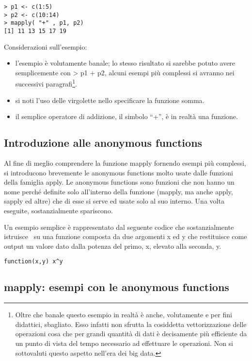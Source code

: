 \begin{lstlisting}
> p1 <- c(1:5)
> p2 <- c(10:14)
> mapply( "+" , p1, p2)
[1] 11 13 15 17 19
\end{lstlisting}

Considerazioni sull'esempio:
\begin{itemize}
\item l'esempio è volutamente banale; lo stesso risultato si sarebbe potuto avere semplicemente con \textsf{> p1 + p2}, alcuni esempi più complessi si avranno nei successivi paragrafi\footnote{Oltre che banale questo esempio in realtà è anche, volutamente e per fini didattici, sbagliato. Esso infatti non sfrutta la cosiddetta vettorizzazione delle operazioni cosa che per grandi quantità di dati è decisamente più efficiente da un punto di vista del tempo necessario ad effettuare le operazioni. Non si sottovaluti questo aspetto nell'era dei big data.}.
\item si noti l'uso delle virgolette nello specificare la funzione somma.
\item il semplice operatore di addizione, il simbolo ``+'', è in realtà una funzione.
\end{itemize}

\subsection{Introduzione alle anonymous functions}

Al fine di meglio comprendere la funzione \textsf{mapply} fornendo esempi più complessi, si introducono brevemente le anonymous functions molto usate dalle funzioni della famiglia \textsf{apply}. Le anonymous functions sono funzioni che non hanno un nome perché definite solo all'interno della funzione (\textsf{mapply}, ma anche \textsf{apply}, \textsf{sapply} ed altre) che di esse si serve ed usate solo al suo interno. Una volta eseguite, sostanzialmente spariscono.

Un esempio semplice è rappresentato dal seguente codice che sostanzialmente istruisce \erre\ su una funzione composta da due argomenti x ed y che restituisce come output un valore dato dalla potenza del primo, x, elevato alla seconda, y.

\begin{lstlisting}
function(x,y) x^y
\end{lstlisting}


\subsection{mapply: esempi con le anonymous functions}

